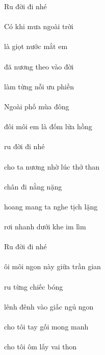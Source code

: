 \documentclass[14pt,a4paper]{extarticle}
\begin{document}
Ru đời đi nhé\\[1ex]
{\Huge \ru {}  }  \\[3ex]
Có khi mưa ngoài trời \\[1ex]
{\Huge {} \khi {}   }\\[1ex]
là giọt nước mắt em\\[1ex]
{\Huge {}    \em }\\[1ex]
đã nương theo vào đời\\[1ex]
{\Huge {}  \theo {}  }\\[1ex]
làm từng nỗi ưu phiền\\[1ex]
{\Huge {}     }\\[1ex]
Ngoài phố mùa đông\\[1ex]
{\Huge {}    }\\[1ex]
đôi môi em là đốm lửa hồng\\[1ex]
{\Huge {}  \em {}    }\\[1ex]
ru đời đi nhé\\[1ex]
{\Huge \ru {}   }\\[1ex]
cho ta nương nhờ lúc thở than\\[1ex]
{\Huge \cho \ta {}    \than }\\[1ex]
chân đi nằng nặng\\[1ex]
{\Huge {}    }\\[1ex]
hoang mang ta nghe tịch lặng\\[1ex]
{\Huge \hoang \mang \ta \nghe {}  }\\[1ex]
rơi nhanh dưới khe im lìm\\[1ex]
{\Huge {} \nhanh {} \khe {} }\\[1ex]
Ru đời đi nhé\\[1ex]
{\Huge \ru {}   }\\[1ex]
ôi môi ngon này giữa trần gian\\[1ex]
{\Huge {}  \ngon {}   \GIan }\\[1ex]
ru từng chiếc bóng\\[1ex]
{\Huge \ru {}   }\\[1ex]
lênh đênh vào giấc ngủ ngon\\[1ex]
{\Huge {}    \ngon }\\[1ex]
cho tôi tay gối mong manh \\[1ex]
{\Huge \cho {} \tay {} \mongmanh }\\[1ex]
cho tôi ôm lấy vai thon\\[1ex]
{\Huge \cho {}   \vai \thon }\\[1ex]
\end{document}
